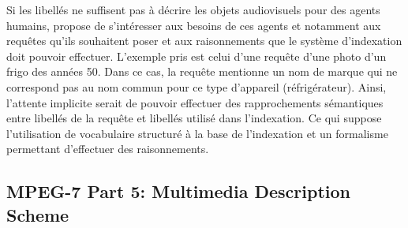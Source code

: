 Si les libellés ne suffisent pas à décrire les objets audiovisuels pour des agents humains, \citeauthor{hare:semantic-gap} propose de s'intéresser aux besoins de ces agents et notamment aux requêtes qu'ils souhaitent poser et aux raisonnements que le système d'indexation doit pouvoir effectuer. 
L'exemple pris est celui d'une requête d'une photo d'un frigo des années 50. 
Dans ce cas, la requête mentionne un nom de marque qui ne correspond pas au nom commun pour ce type d'appareil (réfrigérateur). 
Ainsi, l'attente implicite serait de pouvoir effectuer des rapprochements sémantiques entre libellés de la requête et libellés utilisé dans l'indexation. 
Ce qui suppose l'utilisation de vocabulaire structuré à la base de l'indexation et un formalisme permettant d'effectuer des raisonnements. 










\subsection{MPEG-7 Part 5: Multimedia Description Scheme}

